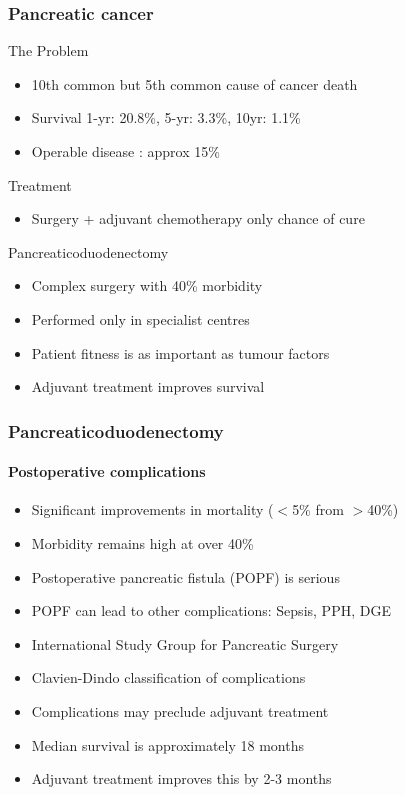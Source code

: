 \documentclass[10pt]{beamer}
\begin{document}
\begin{frame}
	\frametitle{Pancreatic cancer} %
	\begin{block}{The Problem}
		\begin{itemize}
			\item 10th common but 5th common cause of cancer death
			\item Survival	1-yr: 20.8\%, 5-yr: 3.3\%, 10yr: 1.1\%
			\item Operable disease : approx 15\%
		\end{itemize}
	\end{block}
	\begin{block}{Treatment}
		\begin{itemize}
			\item Surgery + adjuvant chemotherapy only chance of cure
		\end{itemize}
	\end{block}
	\begin{block}{Pancreaticoduodenectomy}
		\begin{itemize}
			\item Complex surgery with 40\% morbidity
			\item Performed only in specialist centres
			\item Patient fitness is as important as tumour factors
			\item Adjuvant treatment improves survival
		\end{itemize}
	\end{block}
\end{frame}

\begin{frame}
	\frametitle{Pancreaticoduodenectomy}
	\framesubtitle{Postoperative complications}
	\begin{itemize}
		\item Significant improvements in mortality ($<$5\% from $>$40\%)
		\item Morbidity remains high at over 40\%
		\item Postoperative pancreatic fistula (POPF) is serious
		\item POPF can lead to other complications: Sepsis, PPH, DGE
		\item International Study Group for Pancreatic Surgery
		\item Clavien-Dindo classification of complications
		\medskip
		\item Complications may preclude adjuvant treatment
		\item Median survival is approximately 18 months
		\item Adjuvant treatment improves this by 2-3 months
	\end{itemize}
\end{frame}
\end{document}
